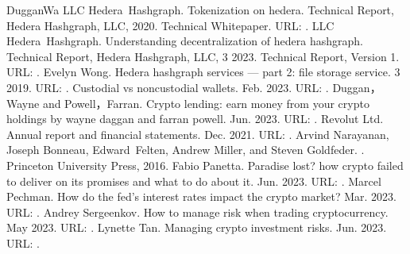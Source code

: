 \documentclass[letterpaper,10pt,english]{jupyterBook}
\begin{document}
\begin{sphinxthebibliography}{DugganWa}
\sphinxAtStartPar
LLC Hedera Hashgraph. Tokenization on hedera. Technical Report, Hedera Hashgraph, LLC, 2020. Technical Whitepaper. URL: .
\sphinxAtStartPar
LLC Hedera Hashgraph. Understanding decentralization of hedera hashgraph. Technical Report, Hedera Hashgraph, LLC, 3 2023. Technical Report, Version 1. URL: .
\sphinxAtStartPar
Evelyn Wong. Hedera hashgraph services — part 2: file storage service. 3 2019. URL: .
\sphinxAtStartPar
Custodial vs non\sphinxhyphen{}custodial wallets. Feb. 2023. URL: .
\sphinxAtStartPar
Duggan，Wayne and Powell，Farran. Crypto lending: earn money from your crypto holdings by wayne daggan and farran powell. Jun. 2023. URL: .
\sphinxAtStartPar
Revolut Ltd. Annual report and financial statements. Dec. 2021. URL: .
\sphinxAtStartPar
Arvind Narayanan, Joseph Bonneau, Edward Felten, Andrew Miller, and Steven Goldfeder. . Princeton University Press, 2016.
\sphinxAtStartPar
Fabio Panetta. Paradise lost? how crypto failed to deliver on its promises and what to do about it. Jun. 2023. URL: .
\sphinxAtStartPar
Marcel Pechman. How do the fed’s interest rates impact the crypto market? Mar. 2023. URL: .
\sphinxAtStartPar
Andrey Sergeenkov. How to manage risk when trading cryptocurrency. May 2023. URL: .
\sphinxAtStartPar
Lynette Tan. Managing crypto investment risks. Jun. 2023. URL: .

\end{sphinxthebibliography}
\end{document}
